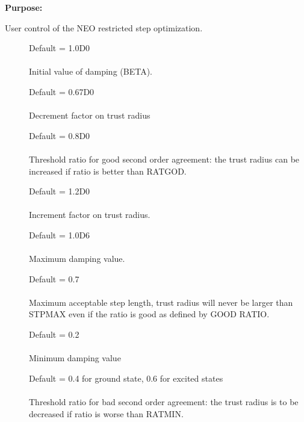{\bf Purpose:}

User control of the NEO restricted step optimization.

\begin{description}
\item[]
  Default = 1.0D0\\
   \\
  Initial value of damping (BETA).

\item[]
  Default = 0.67D0\\
   \\
  Decrement factor on trust radius

\item[]
  Default = 0.8D0 \\
   \\
  Threshold ratio for good second order agreement: the trust radius can
  be increased if ratio is better than RATGOD.

\item[]
  Default = 1.2D0\\
   \\
  Increment factor on trust radius.

\item[]
  Default = 1.0D6\\
   \\
  Maximum damping value.

\item[]
  Default = 0.7\\
   \\
  Maximum acceptable step length, trust radius will never be larger than
  STPMAX even if the ratio is good as defined by GOOD RATIO.

\item[]
  Default = 0.2\\
   \\
  Minimum damping value

\item[]
  Default = 0.4 for ground state, 0.6 for excited states\\
   \\
  Threshold ratio for bad second order agreement: the trust radius is
  to be decreased if ratio is worse than RATMIN.


\end{description}
